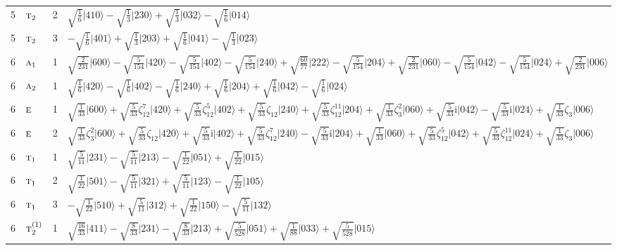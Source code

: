 \documentclass[11pt]{article}
\newcommand{\irr}[1]{\text{\normalfont\scshape #1}}
\newcommand{\iunit}{\mathrm{i}}
\newcommand{\rootunity}[1]{\zeta_{#1}}
\newcommand{\occ}[1]{\lvert #1\rangle}
\begin{document}
\begin{longtable}{c l c p{}}
5 & $\irr{t}_{2}$ & 2 & $\sqrt{\tfrac{1}{6}}\occ{410}-\sqrt{\tfrac{1}{3}}\occ{230}+\sqrt{\tfrac{1}{3}}\occ{032}-\sqrt{\tfrac{1}{6}}\occ{014}$\\
5 & $\irr{t}_{2}$ & 3 & $-\sqrt{\tfrac{1}{6}}\occ{401}+\sqrt{\tfrac{1}{3}}\occ{203}+\sqrt{\tfrac{1}{6}}\occ{041}-\sqrt{\tfrac{1}{3}}\occ{023}$\\
\hline
6 & $\irr{a}_{1}$ & 1 & $\sqrt{\tfrac{2}{231}}\occ{600}-\sqrt{\tfrac{5}{154}}\occ{420}-\sqrt{\tfrac{5}{154}}\occ{402}-\sqrt{\tfrac{5}{154}}\occ{240}+\sqrt{\tfrac{60}{77}}\occ{222}-\sqrt{\tfrac{5}{154}}\occ{204}+\sqrt{\tfrac{2}{231}}\occ{060}-\sqrt{\tfrac{5}{154}}\occ{042}-\sqrt{\tfrac{5}{154}}\occ{024}+\sqrt{\tfrac{2}{231}}\occ{006}$\\
6 & $\irr{a}_{2}$ & 1 & $\sqrt{\tfrac{1}{6}}\occ{420}-\sqrt{\tfrac{1}{6}}\occ{402}-\sqrt{\tfrac{1}{6}}\occ{240}+\sqrt{\tfrac{1}{6}}\occ{204}+\sqrt{\tfrac{1}{6}}\occ{042}-\sqrt{\tfrac{1}{6}}\occ{024}$\\
6 & $\irr{e}$ & 1 & $\sqrt{\tfrac{1}{33}}\occ{600}+\sqrt{\tfrac{5}{33}}\rootunity{12}^{7}\occ{420}+\sqrt{\tfrac{5}{33}}\rootunity{12}^{5}\occ{402}+\sqrt{\tfrac{5}{33}}\rootunity{12}\occ{240}+\sqrt{\tfrac{5}{33}}\rootunity{12}^{11}\occ{204}+\sqrt{\tfrac{1}{33}}\rootunity{3}^{2}\occ{060}+\sqrt{\tfrac{5}{33}}\iunit\occ{042}-\sqrt{\tfrac{5}{33}}\iunit\occ{024}+\sqrt{\tfrac{1}{33}}\rootunity{3}\occ{006}$\\
6 & $\irr{e}$ & 2 & $\sqrt{\tfrac{1}{33}}\rootunity{3}^{2}\occ{600}+\sqrt{\tfrac{5}{33}}\rootunity{12}\occ{420}+\sqrt{\tfrac{5}{33}}\iunit\occ{402}+\sqrt{\tfrac{5}{33}}\rootunity{12}^{7}\occ{240}-\sqrt{\tfrac{5}{33}}\iunit\occ{204}+\sqrt{\tfrac{1}{33}}\occ{060}+\sqrt{\tfrac{5}{33}}\rootunity{12}^{5}\occ{042}+\sqrt{\tfrac{5}{33}}\rootunity{12}^{11}\occ{024}+\sqrt{\tfrac{1}{33}}\rootunity{3}\occ{006}$\\
6 & $\irr{t}_{1}$ & 1 & $\sqrt{\tfrac{5}{11}}\occ{231}-\sqrt{\tfrac{5}{11}}\occ{213}-\sqrt{\tfrac{1}{22}}\occ{051}+\sqrt{\tfrac{1}{22}}\occ{015}$\\
6 & $\irr{t}_{1}$ & 2 & $\sqrt{\tfrac{1}{22}}\occ{501}-\sqrt{\tfrac{5}{11}}\occ{321}+\sqrt{\tfrac{5}{11}}\occ{123}-\sqrt{\tfrac{1}{22}}\occ{105}$\\
6 & $\irr{t}_{1}$ & 3 & $-\sqrt{\tfrac{1}{22}}\occ{510}+\sqrt{\tfrac{5}{11}}\occ{312}+\sqrt{\tfrac{1}{22}}\occ{150}-\sqrt{\tfrac{5}{11}}\occ{132}$\\
6 & $\irr{t}_{2}^{(1)}$ & 1 & $\sqrt{\tfrac{16}{33}}\occ{411}-\sqrt{\tfrac{8}{33}}\occ{231}-\sqrt{\tfrac{8}{33}}\occ{213}+\sqrt{\tfrac{5}{528}}\occ{051}+\sqrt{\tfrac{1}{88}}\occ{033}+\sqrt{\tfrac{5}{528}}\occ{015}$\\

\end{longtable}
\end{document}
